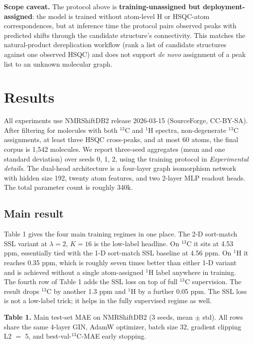 \documentclass[
  11pt,
  a4paper,
]{article}
\begin{document}
\textbf{Scope caveat.} The protocol above is \textbf{training-unassigned but
deployment-assigned}: the model is trained without atom-level H or
HSQC-atom correspondences, but at inference time the protocol pairs
observed peaks with predicted shifts through the candidate
structure's connectivity. This matches the natural-product
dereplication workflow (rank a list of candidate structures against
one observed HSQC) and does not support \emph{de novo} assignment of a
peak list to an unknown molecular graph.

\section{Results}\label{results}

All experiments use NMRShiftDB2 release 2026-03-15 (SourceForge,
CC-BY-SA). After filtering for molecules with both \(^{13}\)C and \(^{1}\)H
spectra, non-degenerate \(^{13}\)C assignments, at least three HSQC
cross-peaks, and at most 60 atoms, the final corpus is 1,542 molecules.
We report three-seed aggregates (mean and one standard deviation) over
seeds 0, 1, 2, using the training protocol in \emph{Experimental details}.
The dual-head
architecture is a four-layer graph isomorphism network with hidden size
192, twenty atom features, and two 2-layer MLP readout heads. The total
parameter count is roughly 340k.

\subsection*{Main result}

Table 1 gives the four main training regimes in one place. The 2-D
sort-match SSL variant at \(\lambda = 2\), \(K = 16\) is the low-label
headline. On \(^{13}\)C it sits at 4.53 ppm, essentially tied with the
1-D sort-match SSL baseline at 4.56 ppm. On \(^{1}\)H it reaches 0.35 ppm,
which is roughly seven times better than either 1-D variant and is
achieved without a single atom-assigned \(^{1}\)H label anywhere in
training. The fourth row of Table 1 adds the SSL loss on top of full
\(^{13}\)C supervision. The result drops \(^{13}\)C by another 1.3 ppm and
\(^{1}\)H by a further 0.05 ppm. The SSL loss is not a low-label trick;
it helps in the fully supervised regime as well.

\textbf{Table 1.} Main test-set MAE on NMRShiftDB2 (3 seeds, mean \(\pm\) std).
All rows share the same 4-layer GIN, AdamW optimizer, batch size 32,
gradient clipping L2 \(=\) 5, and best-val-\(^{13}\)C-MAE early stopping.
\end{document}
